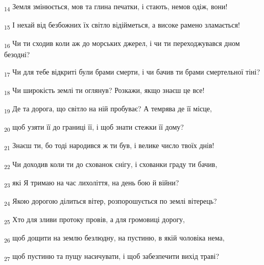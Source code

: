 \begin{tcolorbox}
\textsubscript{14} Земля змінюється, мов та глина печатки, і стають, немов одіж, вони!
\end{tcolorbox}
\begin{tcolorbox}
\textsubscript{15} І нехай від безбожних їх світло відійметься, а високе рамено зламається!
\end{tcolorbox}
\begin{tcolorbox}
\textsubscript{16} Чи ти сходив коли аж до морських джерел, і чи ти переходжувався дном безодні?
\end{tcolorbox}
\begin{tcolorbox}
\textsubscript{17} Чи для тебе відкриті були брами смерти, і чи бачив ти брами смертельної тіні?
\end{tcolorbox}
\begin{tcolorbox}
\textsubscript{18} Чи широкість землі ти оглянув? Розкажи, якщо знаєш це все!
\end{tcolorbox}
\begin{tcolorbox}
\textsubscript{19} Де та дорога, що світло на ній пробуває? А темрява де її місце,
\end{tcolorbox}
\begin{tcolorbox}
\textsubscript{20} щоб узяти її до границі її, і щоб знати стежки її дому?
\end{tcolorbox}
\begin{tcolorbox}
\textsubscript{21} Знаєш ти, бо тоді народився ж ти був, і велике число твоїх днів!
\end{tcolorbox}
\begin{tcolorbox}
\textsubscript{22} Чи доходив коли ти до схованок снігу, і схованки граду ти бачив,
\end{tcolorbox}
\begin{tcolorbox}
\textsubscript{23} які Я тримаю на час лихоліття, на день бою й війни?
\end{tcolorbox}
\begin{tcolorbox}
\textsubscript{24} Якою дорогою ділиться вітер, розпорошується по землі вітерець?
\end{tcolorbox}
\begin{tcolorbox}
\textsubscript{25} Хто для зливи протоку провів, а для громовиці дорогу,
\end{tcolorbox}
\begin{tcolorbox}
\textsubscript{26} щоб дощити на землю безлюдну, на пустиню, в якій чоловіка нема,
\end{tcolorbox}
\begin{tcolorbox}
\textsubscript{27} щоб пустиню та пущу насичувати, і щоб забезпечити вихід траві?
\end{tcolorbox}
